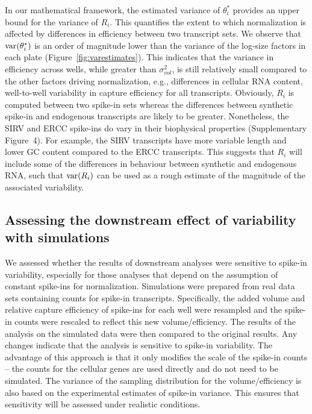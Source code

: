 \documentclass{article}
\newcommand{\suppfigbiophys}{4}
\begin{document}
In our mathematical framework, the estimated variance of $\theta^*_i$ provides an upper bound for the variance of $R_i$.
This quantifies the extent to which normalization is affected by differences in efficiency between two transcript sets.
We observe that $\mbox{var}(\theta^*_i)$ is an order of magnitude lower than the variance of the log-size factors in each plate (Figure~\ref{fig:varestimates}).
This indicates that the variance in efficiency across wells, while greater than $\sigma^2_{vol}$, is still relatively small compared to the other factors driving normalization, e.g., differences in cellular RNA content, well-to-well variability in capture efficiency for all transcripts.
Obviously, $R_i$ is computed between two spike-in sets whereas the differences between synthetic spike-in and endogenous transcripts are likely to be greater.
Nonetheless, the SIRV and ERCC spike-ins do vary in their biophysical properties (Supplementary Figure~\suppfigbiophys{}).
For example, the SIRV transcripts have more variable length and lower GC content compared to the ERCC transcripts.
This suggests that $R_i$ will include some of the differences in behaviour between synthetic and endogenous RNA, such that $\mbox{var}(R_i)$ can be used as a rough estimate of the magnitude of the associated variability.

\subsection{Assessing the downstream effect of variability with simulations}
We assessed whether the results of downstream analyses were sensitive to spike-in variability, especially for those analyses that depend on the assumption of constant spike-ins for normalization.
Simulations were prepared from real data sets containing counts for spike-in transcripts.
Specifically, the added volume and relative capture efficiency of spike-ins for each well were resampled and the spike-in counts were rescaled to reflect this new volume/efficiency.
The results of the analysis on the simulated data were then compared to the original results.
Any changes indicate that the analysis is sensitive to spike-in variability.
The advantage of this approach is that it only modifies the scale of the spike-in counts -- the counts for the cellular genes are used directly and do not need to be simulated.
The variance of the sampling distribution for the volume/efficiency is also based on the experimental estimates of spike-in variance.
This ensures that sensitivity will be assessed under realistic conditions. 
\end{document}
